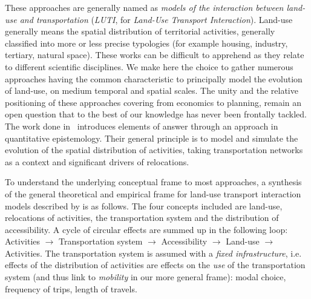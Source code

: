 \documentclass[10pt]{article}
\begin{document}
These approaches are generally named as \emph{models of the interaction between land-use and transportation} (\emph{LUTI}, for \textit{Land-Use Transport Interaction}). Land-use generally means the spatial distribution of territorial activities, generally classified into more or less precise typologies (for example housing, industry, tertiary, natural space). These works can be difficult to apprehend as they relate to different scientific disciplines. We make here the choice to gather numerous approaches having the common characteristic to principally model the evolution of land-use, on medium temporal and spatial scales. The unity and the relative positioning of these approaches covering from economics to planning, remain an open question that to the best of our knowledge has never been frontally tackled. The work done in~\cite{raimbault2020systematic} introduces elements of answer through an approach in quantitative epistemology. Their general principle is to model and simulate the evolution of the spatial distribution of activities, taking transportation networks as a context and significant drivers of relocations.

To understand the underlying conceptual frame to most approaches, a synthesis of the general theoretical and empirical frame for land-use transport interaction models described by \cite{wegener2004land} is as follows. The four concepts included are land-use, relocations of activities, the transportation system and the distribution of accessibility. A cycle of circular effects are summed up in the following loop: Activities $\longrightarrow$ Transportation system $\longrightarrow$ Accessibility $\longrightarrow$ Land-use $\longrightarrow$ Activities. %
The transportation system is assumed with a \emph{fixed infrastructure}, i.e. effects of the distribution of activities are effects on the \emph{use} of the transportation system (and thus link to \emph{mobility} in our more general frame): modal choice, frequency of trips, length of travels.
\end{document}
